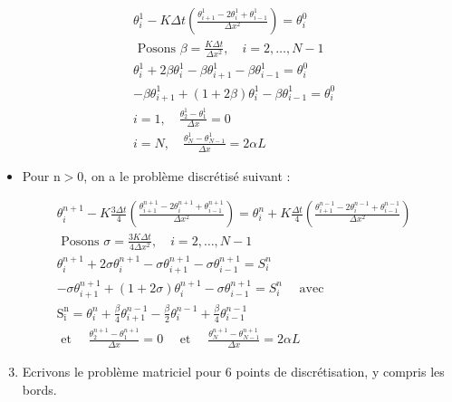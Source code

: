 \documentclass[10pt]{article}
\begin{document}
\[
\begin{aligned}
& \theta_{i}^{1}-K \Delta t\left(\frac{\theta_{i+1}^{1}-2 \theta_{i}^{1}+\theta_{i-1}^{1}}{\Delta x^{2}}\right)=\theta_{i}^{0} \\
& \text { Posons } \beta=\frac{K \Delta t}{\Delta x^{2}}, \quad i=2, \ldots, N-1 \\
& \theta_{i}^{1}+2 \beta \theta_{i}^{1}-\beta \theta_{i+1}^{1}-\beta \theta_{i-1}^{1}=\theta_{i}^{0} \\
& -\beta \theta_{i+1}^{1}+(1+2 \beta) \theta_{i}^{1}-\beta \theta_{i-1}^{1}=\theta_{i}^{0} \\
& i=1, \quad \frac{\theta_{2}^{1}-\theta_{1}^{1}}{\Delta x}=0 \\
& i=N, \quad \frac{\theta_{N}^{1}-\theta_{N-1}^{1}}{\Delta x}=2 \alpha L
\end{aligned}
\]

\begin{itemize}
  \item Pour \(\mathrm{n}>0\), on a le problème discrétisé suivant :
\end{itemize}

\[
\begin{aligned}
& \theta_{i}^{n+1}-K \frac{3 \Delta t}{4}\left(\frac{\theta_{i+1}^{n+1}-2 \theta_{i}^{n+1}+\theta_{i-1}^{n+1}}{\Delta x^{2}}\right)=\theta_{i}^{n}+K \frac{\Delta t}{4}\left(\frac{\theta_{i+1}^{n-1}-2 \theta_{i}^{n-1}+\theta_{i-1}^{n-1}}{\Delta x^{2}}\right) \\
& \text { Posons } \sigma=\frac{3 K \Delta t}{4 \Delta x^{2}}, \quad i=2, \ldots, N-1 \\
& \theta_{i}^{n+1}+2 \sigma \theta_{i}^{n+1}-\sigma \theta_{i+1}^{n+1}-\sigma \theta_{i-1}^{n+1}=S_{i}^{n} \\
& -\sigma \theta_{i+1}^{n+1}+(1+2 \sigma) \theta_{i}^{n+1}-\sigma \theta_{i-1}^{n+1}=S_{i}^{n} \quad \text { avec } \\
& \mathrm{S}_{\mathrm{i}}^{\mathrm{n}}=\theta_{i}^{n}+\frac{\beta}{4} \theta_{i+1}^{n-1}-\frac{\beta}{2} \theta_{i}^{n-1}+\frac{\beta}{4} \theta_{i-1}^{n-1} \\
& \text { et } \quad \frac{\theta_{2}^{n+1}-\theta_{1}^{n+1}}{\Delta x}=0 \quad \text { et } \quad \frac{\theta_{N}^{n+1}-\theta_{N-1}^{n+1}}{\Delta x}=2 \alpha L
\end{aligned}
\]

\begin{enumerate}
  \setcounter{enumi}{2}
  \item Ecrivons le problème matriciel pour 6 points de discrétisation, y compris les bords.
\end{enumerate}
\end{document}
